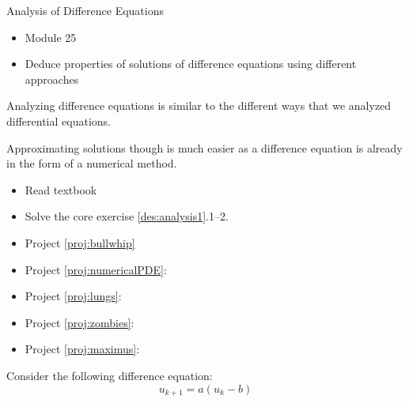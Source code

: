\begin{module}{Analysis of Difference Equations}
	\label{diff:analysis}

	
	
\end{module}



\begin{lesson}

	\begin{itemize}
		\item Module 25
	\end{itemize}

	\begin{itemize}
		\item Deduce properties of solutions of difference equations using different approaches
	\end{itemize}
	


Analyzing difference equations is similar to the different ways that we analyzed differential equations.

Approximating solutions though is much easier as a difference equation is already in the form of a numerical method.

\begin{itemize}
	\item Read textbook
	\item Solve the core exercise \ref{des:analysis1}.1--2.
\end{itemize}

\begin{itemize}
	\item Project \ref{proj:bullwhip} \bullwhiptitle
	\item Project \ref{proj:numericalPDE}: \numericalPDEtitle
	\item Project \ref{proj:lungs}:\lungstitle
	\item Project \ref{proj:zombies}: \zombiestitle
	\item Project \ref{proj:maximus}: \maximustitle
\end{itemize}


\end{lesson}




\question \label{des:analysis1}
	Consider the following difference equation:
		$$u_{k+1} = a(u_k - b)$$


